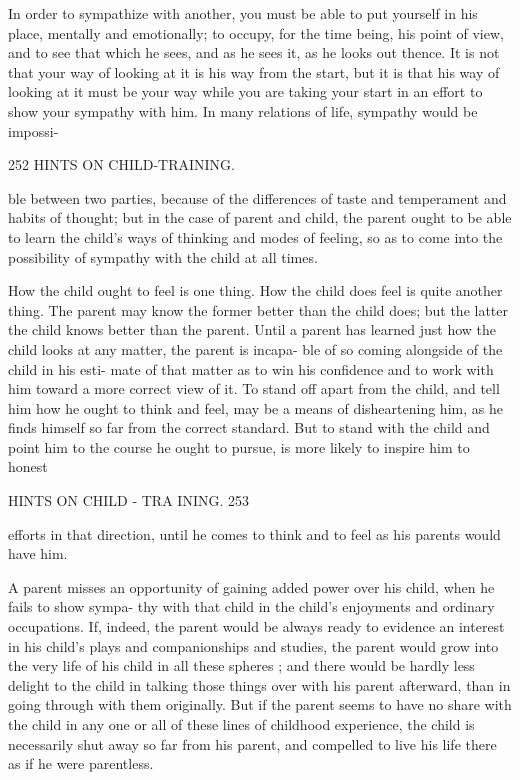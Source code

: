 \documentclass[
]{book}
\begin{document}
In order to sympathize with another, you must be able to put yourself in his place, mentally and emotionally; to occupy, for the time being, his point of view, and to see that which he sees, and as he sees it, as he looks out thence. It is not that your way of looking at it is his way from the start, but it is that his way of looking at it must be your way while you are taking your start in an effort to show your sympathy with him. In many relations of life, sympathy would be impossi-

252 HINTS ON CHILD-TRAINING.

ble between two parties, because of the differences of taste and temperament and habits of thought; but in the case of parent and child, the parent ought to be able to learn the child's ways of thinking and modes of feeling, so as to come into the possibility of sympathy with the child at all times.

How the child ought to feel is one thing. How the child does feel is quite another thing. The parent may know the former better than the child does; but the latter the child knows better than the parent. Until a parent has learned just how the child looks at any matter, the parent is incapa- ble of so coming alongside of the child in his esti- mate of that matter as to win his confidence and to work with him toward a more correct view of it. To stand off apart from the child, and tell him how he ought to think and feel, may be a means of disheartening him, as he finds himself so far from the correct standard. But to stand with the child and point him to the course he ought to pursue, is more likely to inspire him to honest

HINTS ON CHILD - TRA INING. 253

efforts in that direction, until he comes to think and to feel as his parents would have him.

A parent misses an opportunity of gaining added power over his child, when he fails to show sympa- thy with that child in the child's enjoyments and ordinary occupations. If, indeed, the parent would be always ready to evidence an interest in his child's plays and companionships and studies, the parent would grow into the very life of his child in all these spheres ; and there would be hardly less delight to the child in talking those things over with his parent afterward, than in going through with them originally. But if the parent seems to have no share with the child in any one or all of these lines of childhood experience, the child is necessarily shut away so far from his parent, and compelled to live his life there as if he were parentless.
\end{document}
